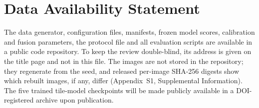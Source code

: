 \documentclass[12pt]{article}
\begin{document}

\section*{Data Availability Statement}

The data generator, configuration files, manifests, frozen model
scores, calibration and fusion parameters, the protocol file and all
evaluation scripts are available in a public code repository. To keep
the review double-blind, its address is given on the title page and not
in this file. The images are not stored in the repository; they
regenerate from the seed, and released per-image SHA-256 digests show
which rebuilt images, if any, differ (Appendix~S1, Supplemental
Information). The five trained tile-model checkpoints will be made
publicly available in a DOI-registered archive upon publication.
\end{document}
